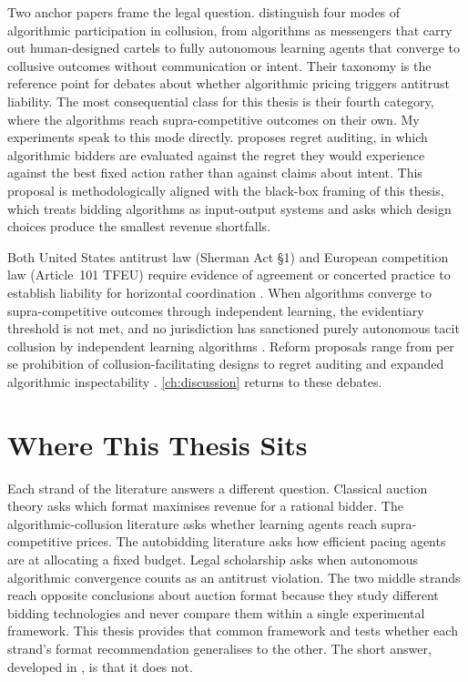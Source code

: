 Two anchor papers frame the legal question. \citet{EzrachiStucke2017} distinguish four modes of algorithmic participation in collusion, from algorithms as messengers that carry out human-designed cartels to fully autonomous learning agents that converge to collusive outcomes without communication or intent. Their taxonomy is the reference point for debates about whether algorithmic pricing triggers antitrust liability. The most consequential class for this thesis is their fourth category, where the algorithms reach supra-competitive outcomes on their own. My experiments speak to this mode directly. \citet{Hartline2024} proposes regret auditing, in which algorithmic bidders are evaluated against the regret they would experience against the best fixed action rather than against claims about intent. This proposal is methodologically aligned with the black-box framing of this thesis, which treats bidding algorithms as input-output systems and asks which design choices produce the smallest revenue shortfalls.

Both United States antitrust law (Sherman Act \S1) and European competition law (Article~101 TFEU) require evidence of agreement or concerted practice to establish liability for horizontal coordination \citep{Mehra2016}. When algorithms converge to supra-competitive outcomes through independent learning, the evidentiary threshold is not met, and no jurisdiction has sanctioned purely autonomous tacit collusion by independent learning algorithms \citep{OECD2017, OECD2023}. Reform proposals range from per se prohibition of collusion-facilitating designs \citep{Harrington2018} to regret auditing \citep{Hartline2024} and expanded algorithmic inspectability \citep{Gal2019}. \cref{ch:discussion} returns to these debates.

\section{Where This Thesis Sits}
\label{sec:lit_summary}

Each strand of the literature answers a different question. Classical auction theory asks which format maximises revenue for a rational bidder. The algorithmic-collusion literature asks whether learning agents reach supra-competitive prices. The autobidding literature asks how efficient pacing agents are at allocating a fixed budget. Legal scholarship asks when autonomous algorithmic convergence counts as an antitrust violation. The two middle strands reach opposite conclusions about auction format because they study different bidding technologies and never compare them within a single experimental framework. This thesis provides that common framework and tests whether each strand's format recommendation generalises to the other. The short answer, developed in , is that it does not.
